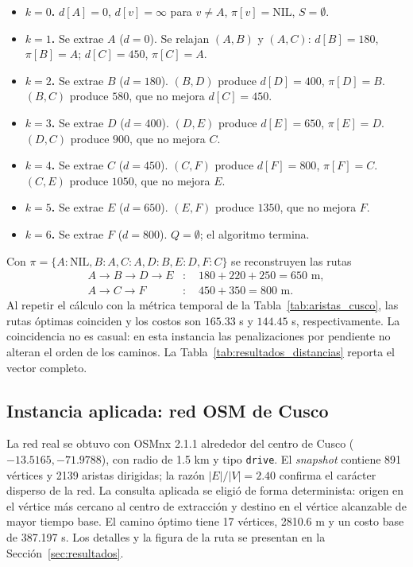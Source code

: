 \begin{itemize}
    \item \textbf{$k=0$.} $d[A]=0$, $d[v]=\infty$ para $v\ne A$, $\pi[v]=\text{NIL}$, $S=\emptyset$.
    \item \textbf{$k=1$.} Se extrae $A$ ($d=0$). Se relajan $(A,B)$ y $(A,C)$: $d[B]=180$, $\pi[B]=A$; $d[C]=450$, $\pi[C]=A$.
    \item \textbf{$k=2$.} Se extrae $B$ ($d=180$). $(B,D)$ produce $d[D]=400$, $\pi[D]=B$. $(B,C)$ produce $580$, que no mejora $d[C]=450$.
    \item \textbf{$k=3$.} Se extrae $D$ ($d=400$). $(D,E)$ produce $d[E]=650$, $\pi[E]=D$. $(D,C)$ produce $900$, que no mejora $C$.
    \item \textbf{$k=4$.} Se extrae $C$ ($d=450$). $(C,F)$ produce $d[F]=800$, $\pi[F]=C$. $(C,E)$ produce $1050$, que no mejora $E$.
    \item \textbf{$k=5$.} Se extrae $E$ ($d=650$). $(E,F)$ produce $1350$, que no mejora $F$.
    \item \textbf{$k=6$.} Se extrae $F$ ($d=800$). $Q=\emptyset$; el algoritmo termina.
\end{itemize}



Con $\pi=\{A:\text{NIL},B:A,C:A,D:B,E:D,F:C\}$ se reconstruyen las rutas
\begin{align}
    A\to B\to D\to E &: \quad 180+220+250=650\text{ m},\\
    A\to C\to F &: \quad 450+350=800\text{ m}.
\end{align}
Al repetir el cálculo con la métrica temporal de la Tabla~\ref{tab:aristas_cusco}, las rutas óptimas coinciden y los costos son $165.33$ s y $144.45$ s, respectivamente. La coincidencia no es casual: en esta instancia las penalizaciones por pendiente no alteran el orden de los caminos. La Tabla~\ref{tab:resultados_distancias} reporta el vector completo.



\subsection{Instancia aplicada: red OSM de Cusco}
La red real se obtuvo con OSMnx 2.1.1 alrededor del centro de Cusco ($-13.5165,-71.9788$), con radio de 1.5 km y tipo \texttt{drive}. El \textit{snapshot} contiene 891 vértices y 2139 aristas dirigidas; la razón $|E|/|V|=2.40$ confirma el carácter disperso de la red. La consulta aplicada se eligió de forma determinista: origen en el vértice más cercano al centro de extracción y destino en el vértice alcanzable de mayor tiempo base. El camino óptimo tiene 17 vértices, 2810.6 m y un costo base de 387.197 s. Los detalles y la figura de la ruta se presentan en la Sección~\ref{sec:resultados}.
